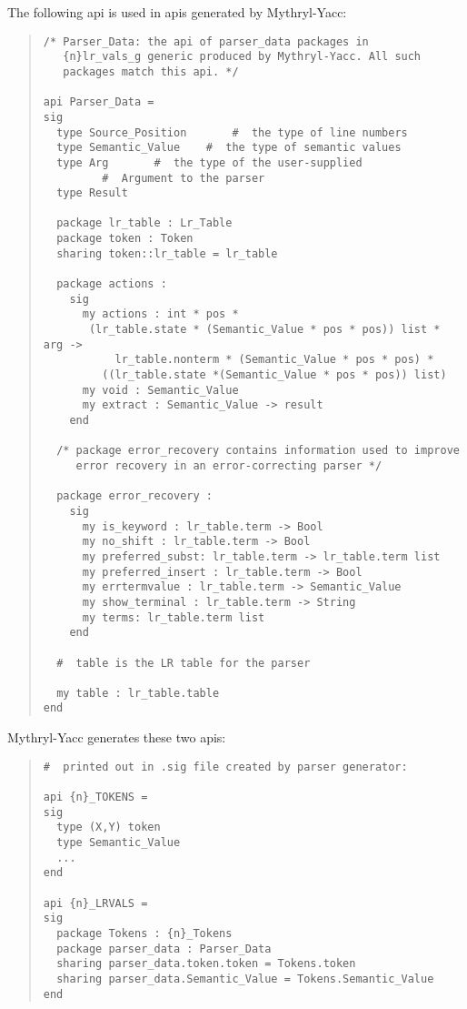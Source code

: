 The following api is used in apis generated by
Mythryl-Yacc:
\begin{quote}
\begin{verbatim}
/* Parser_Data: the api of parser_data packages in
   {n}lr_vals_g generic produced by Mythryl-Yacc. All such
   packages match this api. */

api Parser_Data =
sig
  type Source_Position       #  the type of line numbers 
  type Semantic_Value    #  the type of semantic values 
  type Arg       #  the type of the user-supplied 
		 #  Argument to the parser 
  type Result

  package lr_table : Lr_Table
  package token : Token
  sharing token::lr_table = lr_table

  package actions : 
    sig
      my actions : int * pos *
       (lr_table.state * (Semantic_Value * pos * pos)) list * arg ->
	       lr_table.nonterm * (Semantic_Value * pos * pos) *
	     ((lr_table.state *(Semantic_Value * pos * pos)) list)
      my void : Semantic_Value
      my extract : Semantic_Value -> result
    end

  /* package error_recovery contains information used to improve
     error recovery in an error-correcting parser */

  package error_recovery :
    sig
      my is_keyword : lr_table.term -> Bool
      my no_shift : lr_table.term -> Bool
      my preferred_subst: lr_table.term -> lr_table.term list
      my preferred_insert : lr_table.term -> Bool
      my errtermvalue : lr_table.term -> Semantic_Value
      my show_terminal : lr_table.term -> String
      my terms: lr_table.term list
    end

  #  table is the LR table for the parser 

  my table : lr_table.table
end
\end{verbatim}
\end{quote}

Mythryl-Yacc generates these two apis:
\begin{quote}
\begin{verbatim}
#  printed out in .sig file created by parser generator: 

api {n}_TOKENS = 
sig
  type (X,Y) token
  type Semantic_Value
  ...
end

api {n}_LRVALS =
sig
  package Tokens : {n}_Tokens
  package parser_data : Parser_Data
  sharing parser_data.token.token = Tokens.token
  sharing parser_data.Semantic_Value = Tokens.Semantic_Value
end
\end{verbatim}
\end{quote}
